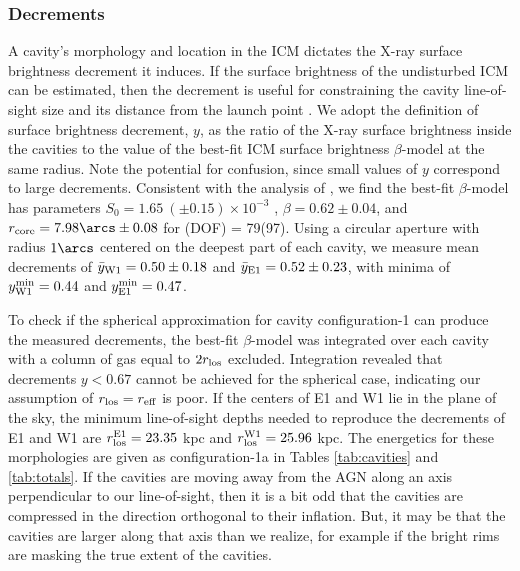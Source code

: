 \documentclass[11pt, preprint]{aastex}
\begin{document}
\subsubsection{Decrements}
\label{sec:dec}

A cavity's morphology and location in the ICM dictates the X-ray
surface brightness decrement it induces. If the surface brightness of
the undisturbed ICM can be estimated, then the decrement is useful for
constraining the cavity line-of-sight size and its distance from the
launch point \citep[\eg\ \rlos\ and $z$; see][for details]{hydraa}. We
adopt the \citet{hydraa} definition of surface brightness decrement,
$y$, as the ratio of the X-ray surface brightness inside the cavities
to the value of the best-fit ICM surface brightness $\beta$-model at
the same radius. Note the potential for confusion, since small values
of $y$ correspond to large decrements. Consistent with the analysis of
\citet{schindler01}, we find the best-fit $\beta$-model has parameters
$S_0 = 1.65 ~(\pm 0.15) \times 10^{-3}$ \sbr, $\beta = 0.62 \pm 0.04$,
and $r_{\rm{core}} = 7.98\arcs \pm 0.08$ for \chisq(DOF) =
79(97). Using a circular aperture with radius $1\arcs$ centered on the
deepest part of each cavity, we measure mean decrements of
$\bar{y}_{\rm{W1}} = 0.50 \pm 0.18$ and $\bar{y}_{\rm{E1}} = 0.52 \pm
0.23$, with minima of $y^{\rm{min}}_{\rm{W1}} = 0.44$ and
$y^{\rm{min}}_{\rm{E1}} = 0.47$.

To check if the spherical approximation for cavity configuration-1 can
produce the measured decrements, the best-fit $\beta$-model was
integrated over each cavity with a column of gas equal to $2r_{\rm{los}}$
excluded. Integration revealed that decrements $y < 0.67$ cannot be
achieved for the spherical case, indicating our assumption of $r_{\rm{los}} =
r_{\rm{eff}}$ is poor. If the centers of E1 and W1 lie in the plane of the
sky, the minimum line-of-sight depths needed to reproduce the
decrements of E1 and W1 are $r_{\rm{los}}^{\rm{E1}} = 23.35$ kpc and
$r_{\rm{los}}^{\rm{W1}} = 25.96$ kpc. The energetics for these morphologies
are given as configuration-1a in Tables \ref{tab:cavities} and
\ref{tab:totals}. If the cavities are moving away from the AGN along
an axis perpendicular to our line-of-sight, then it is a bit odd that
the cavities are compressed in the direction orthogonal to their
inflation. But, it may be that the cavities are larger along that axis
than we realize, for example if the bright rims are masking the true
extent of the cavities.
\end{document}
